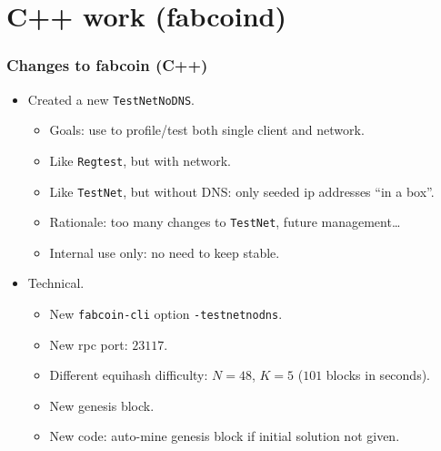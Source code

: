 \section{C++ work (fabcoind)}
\begin{frame}[fragile]
\frametitle{Changes to fabcoin (C++)}
\begin{itemize}
\item Created a new \verb|TestNetNoDNS|.
\begin{itemize}
\item Goals: use to profile/test both single client and network.
\item Like \verb|Regtest|, but with network. 
\item Like \verb|TestNet|, but without DNS: only seeded ip addresses ``in a box''. 
\item Rationale: too many changes to \verb|TestNet|, future management\dots
\item Internal use only: no need to keep stable.
\end{itemize}
\item Technical.
\begin{itemize}
\item New \verb|fabcoin-cli| option \verb|-testnetnodns|.
\item New rpc port: $23117$.
\item Different equihash difficulty: $N=48$, $K=5$ ($101$ blocks in seconds).
\item New genesis block.
\item New code: auto-mine genesis block if initial solution not given.
\end{itemize}
\end{itemize}

\end{frame}